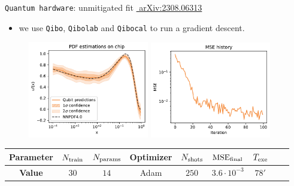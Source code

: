 \documentclass[8pt, xcolor={svgnames}, hyperref={linkcolor=black}, aspectratio=169]{beamer}
\begin{document}
\begin{frame}{\texttt{Quantum hardware}: unmitigated fit \hfill \href{https://arxiv.org/abs/2308.06313}{\faBook\,\,arXiv:2308.06313}}
\begin{itemize}[noitemsep]
\item[\faGamepad] we use \texttt{Qibo}, \texttt{Qibolab} and \texttt{Qibocal} to run a gradient descent.
\end{itemize}
\pause
\begin{figure}  
  \includegraphics[width=0.47\textwidth]{figures/qpdf_full_stack.pdf}%
  \includegraphics[width=0.47\textwidth]{figures/loss.pdf}%
\end{figure}
\begin{table}[ht]
\centering
\begin{tabular}{ccccccccc}
\hline \hline 
\rule{0pt}{2.5ex}
\textbf{Parameter} & $N_{\rm train}$ & $N_{\rm params}$ & Optimizer & $N_{\rm shots}$ & $\text{MSE}_{\rm final}$ & $T_{\rm exe}$ \\
\hline
\rule{0pt}{2.5ex}
\textbf{Value} & $30$ & $14$ & Adam & $250$ & $3.6\cdot 10^{-3}$ & $78'$ \\
\hline \hline 
\end{tabular}
\label{tab:qml}
\end{table}
\end{frame}
\end{document}
